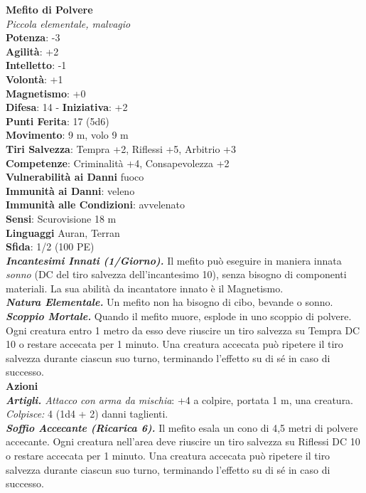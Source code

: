 \begin{multicols}{2}
\medskip\textbf{Mefito di Polvere}\\
\emph{Piccola elementale, malvagio}\\
\textbf{Potenza}: -3\\
\textbf{Agilità}: +2\\
\textbf{Intelletto}: -1\\
\textbf{Volontà}: +1\\
\textbf{Magnetismo}: +0\\
\textbf{Difesa}: 14 - \textbf{Iniziativa}: +2\\
\textbf{Punti Ferita}: 17 (5d6)\\
\textbf{Movimento}: 9 m, volo 9 m\\
\textbf{Tiri Salvezza}: Tempra +2, Riflessi +5, Arbitrio +3\\
\textbf{Competenze}: Criminalità +4, Consapevolezza +2\\
\textbf{Vulnerabilità ai Danni} fuoco\\
\textbf{Immunità ai Danni}: veleno\\
\textbf{Immunità alle Condizioni}: avvelenato\\
\textbf{Sensi}: Scurovisione 18 m\\
\textbf{Linguaggi} Auran, Terran\\
\textbf{Sfida}: 1/2 (100 PE)\smallskip\\
\emph{\textbf{Incantesimi Innati (1/Giorno).}} Il mefito può eseguire in maniera innata \emph{sonno} (DC del tiro salvezza dell'incantesimo 10), senza bisogno di componenti materiali. La sua abilità da incantatore innato è il Magnetismo.\\
\emph{\textbf{Natura Elementale.}} Un mefito non ha bisogno di cibo, bevande o sonno.\\
\emph{\textbf{Scoppio Mortale.}} Quando il mefito muore, esplode in uno scoppio di polvere. Ogni creatura entro 1 metro da esso deve riuscire un tiro salvezza su Tempra DC 10 o restare accecata per 1 minuto. Una creatura accecata può ripetere il tiro salvezza durante ciascun suo turno, terminando l'effetto su di sé in caso di successo. \\
\smallskip\textbf{Azioni}\\
\emph{\textbf{Artigli.} Attacco con arma da mischia}: +4 a colpire, portata 1 m, una creatura.\\
\emph{Colpisce:} 4 (1d4 + 2) danni taglienti.\\
\emph{\textbf{Soffio Accecante (Ricarica 6).}} Il mefito esala un cono di 4,5 metri di polvere accecante. Ogni creatura nell'area deve riuscire un tiro salvezza su Riflessi DC 10 o restare accecata per 1 minuto. Una creatura accecata può ripetere il tiro salvezza durante ciascun suo turno, terminando l'effetto su di sé in caso di successo.\\

\end{multicols}
